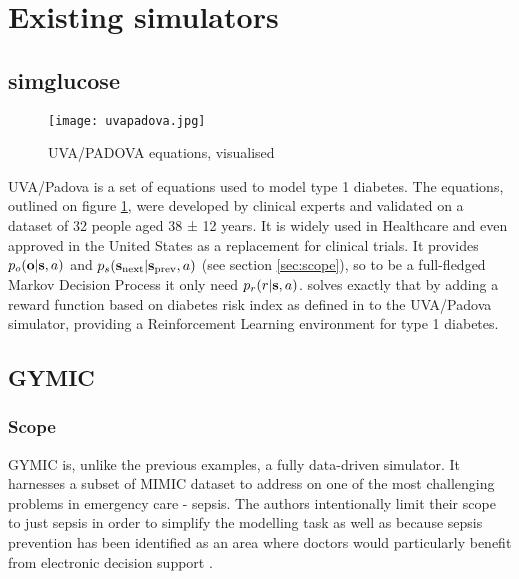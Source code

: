 \section{Existing simulators}
\label{sec:existing}

\subsection{simglucose}
\label{sec:simglucose}

\begin{figure}
    \centering
    \texttt{[image: uvapadova.jpg]}
    \caption{UVA/PADOVA equations, visualised}
    \label{fig:uvapadova}
\end{figure}

UVA/Padova \cite{sim-diabetes-fda} is a set of equations used to model type 1 diabetes.
The equations, outlined on figure \ref{fig:uvapadova}, were developed by clinical experts and validated on a dataset of 32 people aged 38 ± 12 years.
It is widely used in Healthcare and even approved in the United States as a replacement for clinical trials.
It provides $p_o(\mathbf{o} | \textbf{s}, a)$ and $p_s(\textbf{s}_\text{next} | \textbf{s}_\text{prev}, a)$ (see section \ref{sec:scope}), so to be a full-fledged Markov Decision Process it only need $p_r(r|\textbf{s},a)$.
\cite{simglucose} solves exactly that by adding a reward function based on diabetes risk index as defined in \cite{diabetesrisk} to the UVA/Padova simulator, providing a Reinforcement Learning environment for type 1 diabetes.

\subsection{GYMIC}
\label{sec:gymic}

\subsubsection{Scope}
GYMIC \cite{gym-sepsis} is, unlike the previous examples, a fully data-driven simulator. 
It harnesses a subset of MIMIC \cite{johnsonMIMICIVFreelyAccessible2023} dataset to address on one of the most challenging problems in emergency care - sepsis.
The authors intentionally limit their scope to just sepsis in order to simplify the modelling task as well as because sepsis prevention has been identified as an area where doctors would particularly benefit from electronic decision support \cite{sepsis-motivation1,sepsis-motivation2}.

